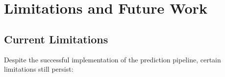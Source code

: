 \documentclass[12pt, a4paper]{article}
\begin{document}
%    
%    
%
%


\clearpage
\section{Limitations and Future Work}

\subsection{Current Limitations}
Despite the successful implementation of the prediction pipeline, certain limitations still persist:
\end{document}
